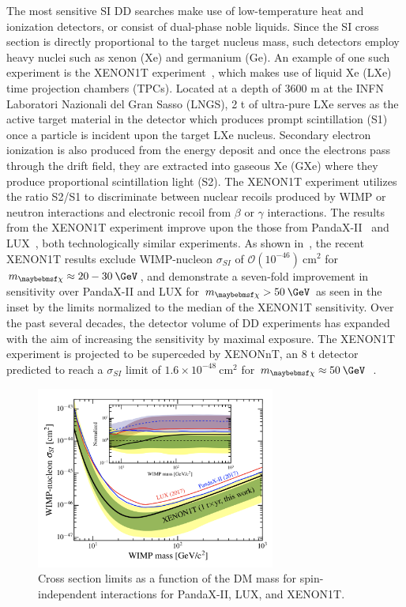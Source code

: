 The most sensitive SI DD searches make use of low-temperature heat and ionization detectors, or consist of dual-phase noble liquids. Since the SI cross section is directly proportional to the target nucleus mass, such detectors employ heavy nuclei such as xenon (Xe) and germanium (Ge). An example of one such experiment is the XENON1T experiment~\cite{refId0}, which makes use of liquid Xe (LXe) time projection chambers (TPCs). Located at a depth of 3600 m at the INFN Laboratori Nazionali del Gran Sasso (LNGS), 2 t of ultra-pure LXe serves as the active target material in the detector which produces prompt scintillation (S1) once a particle is incident upon the target LXe nucleus. Secondary electron ionization is also produced from the energy deposit and once the electrons pass through the drift field, they are extracted into gaseous Xe (GXe) where they produce proportional scintillation light (S2). The XENON1T experiment utilizes the ratio S2/S1 to discriminate between nuclear recoils produced by WIMP or neutron interactions and electronic recoil from $\beta$ or $\gamma$ interactions. The results from the XENON1T experiment improve upon the those from PandaX-II~\cite{PhysRevLett.119.181302} and LUX~\cite{PhysRevLett.118.021303}, both technologically similar experiments. As shown in~, the recent XENON1T results exclude WIMP-nucleon $\sigma_{SI}$ of $\mathcal{O}(10^{-46})\:\mathrm{cm}^2$ for $\mDM \approx 20-30\:\GeV$, and demonstrate a seven-fold improvement in sensitivity over PandaX-II and LUX for $\mDM > 50\:\GeV$ as seen in the inset by the limits normalized to the median of the XENON1T sensitivity. Over the past several decades, the detector volume of DD experiments has expanded with the aim of increasing the sensitivity by maximal exposure. The XENON1T experiment is projected to be superceded by XENONnT, an 8 t detector predicted to reach a $\sigma_{SI}$ limit of $1.6\times10^{-48}\:\mathrm{cm}^2$ for $\mDM\approx 50\:\GeV$~\cite{2017APS..APR.J9003A}.

\begin{figure}
  \centering
  \includegraphics[width=0.7\textwidth]{figs/Xenon1T}
  \caption{Cross section limits as a function of the DM mass for spin-independent interactions for PandaX-II, LUX, and XENON1T.}
  \label{fig:xenon1t}
\end{figure}


